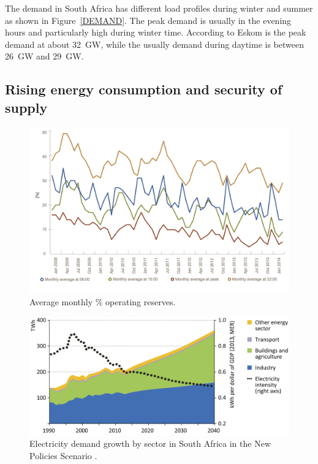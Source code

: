 The demand in South Africa has different load profiles during winter and summer as shown in Figure~\ref{DEMAND}. The peak demand is usually in the evening hours and particularly high during winter time. According to Eskom is the peak demand at about 32~GW, while the usually demand during daytime is between 26~GW and 29~GW. \cite{Eskom2014}

\subsection{Rising energy consumption and security of supply}

\begin{figure}[!h] %
\centering
\includegraphics[width=0.9\linewidth]{FIG/AveragemonthlySA}
\caption[Average monthly \% operating reserves.]{Average monthly \% operating reserves\cite{Eskom2014}.}\label{Abb1}
\end{figure}


\begin{figure}[!h] %
\centering
\includegraphics[width=0.9\linewidth]{FIG/SA_Electricity_demand_growth}
\caption[Electricity demand growth by sector in South Africa in the New Policies Scenario.]{Electricity demand growth by sector in South Africa in the New Policies Scenario \cite{IEA2014f}.}\label{Abb1}
\end{figure}

